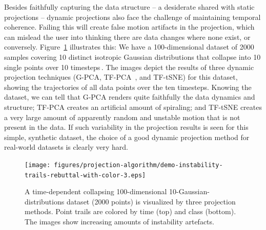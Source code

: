 Besides faithfully capturing the data structure -- a desiderate shared with static projections -- dynamic projections also face the challenge of maintaining temporal coherence. Failing this will create false motion artifacts in the projection, which can mislead the user into thinking there are data changes where none exist, or conversely. Figure~\ref{fig:demo-instability} illustrates this: We have a 100-dimensional dataset of 2000 samples covering 10 distinct isotropic Gaussian distributions that collapse into 10 single points over 10 timesteps\,\cite{Rauber2016}. The images depict the results of three dynamic projection techniques (G-PCA, TF-PCA~\cite{pca}, and TF-tSNE\cite{vanderMaaten2008}) for this dataset, showing the trajectories of all data points over the ten timesteps. Knowing the dataset, we can tell that G-PCA renders quite faithfully the data dynamics and structure; TF-PCA creates an artificial amount of spiraling; and TF-tSNE creates a very large amount of apparently random and unstable motion that is not present in the data. If such variability in the projection results is seen for this simple, synthetic dataset, the choice of a good dynamic projection method for real-world datasets is clearly very hard.




\begin{figure}[h]
 \centering
 \texttt{[image: figures/projection-algorithm/demo-instability-trails-rebuttal-with-color-3.eps]}
 \caption{A time-dependent collapsing 100-dimensional 10-Gaussian-distributions dataset (2000 points) is visualized by three projection methods. Point trails are colored by time (top) and class (bottom). The images show increasing amounts of instability artefacts.}
 \label{fig:demo-instability}
 \vspace{-0.15cm}
\end{figure}

